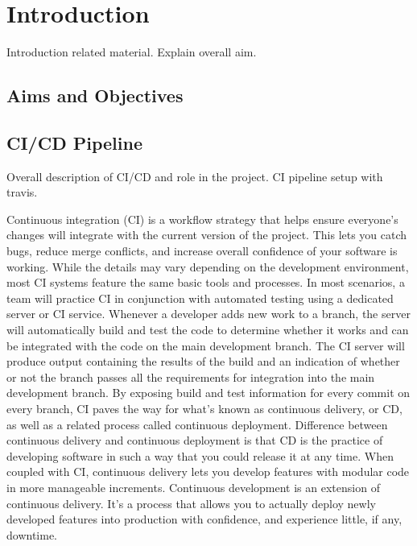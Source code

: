 \chapter{Introduction} \label{chap:introduction}

Introduction related material. Explain overall aim.
\section{Aims and Objectives}

\section{CI/CD Pipeline}
Overall description of CI/CD and role in the project. CI pipeline setup with travis.

Continuous integration (CI) is a workflow strategy that helps ensure everyone's changes will integrate with the current version of the project. This lets you catch bugs, reduce merge conflicts, and increase overall confidence of your software is working. While the details may vary depending on the development environment, most CI systems feature the same basic tools and processes. In most scenarios, a team will practice CI in conjunction with automated testing using a dedicated server or CI service. Whenever a developer adds new work to a branch, the server will automatically build and test the code to determine whether it works and can be integrated with the code on the main development branch. The CI server will produce output containing the results of the build and an indication of whether or not the branch passes all the requirements for integration into the main development branch. By exposing build and test information for every commit on every branch, CI paves the way for what's known as continuous delivery, or CD, as well as a related process called continuous deployment. Difference between continuous delivery and continuous deployment is that CD is the practice of developing software in such a way that you could release it at any time. When coupled with CI, continuous delivery lets you develop features with modular code in more manageable increments. Continuous development is an extension of continuous delivery. It's a process that allows you to actually deploy newly developed features into production with confidence, and experience little, if any, downtime. 

